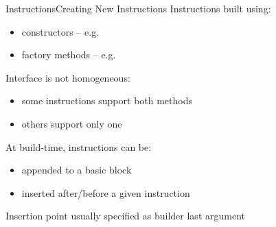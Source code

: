 \begin{frame}{Instructions}{Creating New Instructions}
Instructions built using:

\begin{itemize}
\item constructors -- e.g. 
\item factory methods -- e.g. 
\end{itemize}

Interface is not homogeneous:

\begin{itemize}
\item some instructions support both methods
\item others support only one
\end{itemize}

\vfill
At build-time, instructions can be:

\begin{itemize}
\item appended to a basic block
\item inserted after/before a given instruction
\end{itemize}

Insertion point usually specified as builder last argument
\end{frame}

